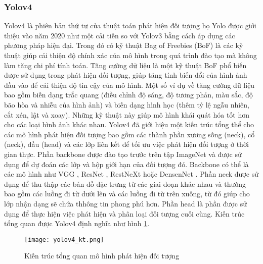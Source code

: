 \documentclass[../the.tex]{subfiles}
\begin{document}
\subsubsection{Yolov4}
{\fontsize{13}{12} \selectfont 
Yolov4 là phiên bản thứ tư của thuật toán phát hiện đối tượng họ Yolo được giới thiệu vào năm 2020 \cite{bochkovskiy2020yolov4} như một cải tiến so với Yolov3 bằng cách áp dụng các phương pháp hiện đại.
Trong đó có kỹ thuật Bag of Freebies (BoF) là các kỹ thuật giúp cải thiện độ chính xác của mô hình trong quá trình đào tạo mà không làm tăng chi phí tính toán.
Tăng cường dữ liệu là một kỹ thuật BoF phổ biến được sử dụng trong phát hiện đối tượng, giúp tăng tính biến đổi của hình ảnh đầu vào để cải thiện độ tin cậy của mô hình. Một số ví dụ về tăng cường dữ liệu bao gồm biến dạng trắc quang (điều chỉnh độ sáng, độ tương phản, màu sắc, độ bão hòa và nhiễu của hình ảnh) và biến dạng hình học (thêm tỷ lệ ngẫu nhiên, cắt xén, lật và xoay). Những kỹ thuật này giúp mô hình khái quát hóa tốt hơn cho các loại hình ảnh khác nhau.
Yolov4 đã giới hiệu một kiến trúc tổng thể cho các mô hình phát hiện đối tượng bao gồm các thành phần xương sống (neck), cổ (neck), đầu (head) và các lớp liên kết để tối ưu việc phát hiện đối tượng ở thời gian thực. Phần backbone được đào tạo trước trên tập ImageNet và được sử dụng để dự đoán các lớp và hộp giới hạn của đối tượng đó.
Backbone có thể là các mô hình như VGG \cite{simonyan2015deep}, ResNet \cite{he2015deep}, RestNeXt \cite{xie2017aggregated} hoặc DensenNet \cite{huang2018densely}.
Phần neck được sử dụng để thu thập các bản đồ đặc trưng từ các giai đoạn khác nhau và thường bao gồm các luồng đi từ dưới lên và các luồng đi từ trên xuống, từ đó giúp cho lớp nhận dạng sẽ chứa thhông tin phong phú hơn. Phần head là phần được sử dụng để thực hiện việc phát hiện và phân loại đối tượng cuối cùng.
Kiến trúc tổng quan được Yolov4 định nghĩa như hình \ref{fig:yolov4_1}.
}
\begin{figure}[H]
	\centering
	\texttt{[image: yolov4\_kt.png]}
	\caption{Kiến trúc tổng quan mô hình phát hiện đối tượng \cite{bochkovskiy2020yolov4}}
	\label{fig:yolov4_1}
\end{figure}
\bigskip
\end{document}
